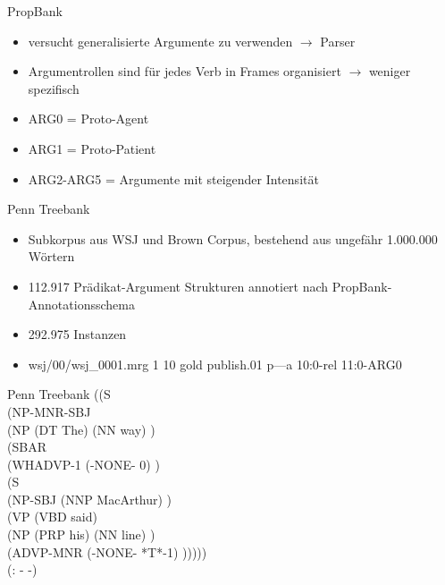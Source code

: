 \documentclass[10pt]{beamer}
\begin{document}
\begin{frame}{PropBank}
  \begin{itemize}
   \item versucht generalisierte Argumente zu verwenden $\rightarrow$ Parser
   \item Argumentrollen sind für jedes Verb in Frames organisiert $\rightarrow$ weniger spezifisch
   \item ARG0 = Proto-Agent
   \item ARG1 = Proto-Patient
   \item ARG2-ARG5 = Argumente mit steigender Intensität
  \end{itemize}
\end{frame}


\begin{frame}{Penn Treebank}
  \begin{itemize}
   \item Subkorpus aus WSJ und Brown Corpus, bestehend aus ungefähr 1.000.000 Wörtern
   \item 112.917 Prädikat-Argument Strukturen annotiert nach PropBank-Annotationsschema
   \item 292.975 Instanzen
   \item wsj/00/wsj\_0001.mrg 1 10 gold publish.01 p---a 10:0-rel 11:0-ARG0
          
  \end{itemize}
  
\end{frame}

\begin{frame}{Penn Treebank}
((S \\
\hspace{10pt}   (NP-MNR-SBJ \\
\hspace{25pt}   (NP (DT The) (NN way) ) \\
\hspace{25pt} (SBAR \\
\hspace{40pt}  (WHADVP-1 (-NONE- 0) )\\
\hspace{40pt}   (S \\
\hspace{60pt}      (NP-SBJ (NNP MacArthur) )\\
\hspace{60pt}    (VP (VBD said) \\
\hspace{80pt}       (NP (PRP his) (NN line) )\\
\hspace{80pt}      (ADVP-MNR (-NONE- *T*-1) )))))\\
 (: - -) \\
    

\end{frame}
\end{document}
